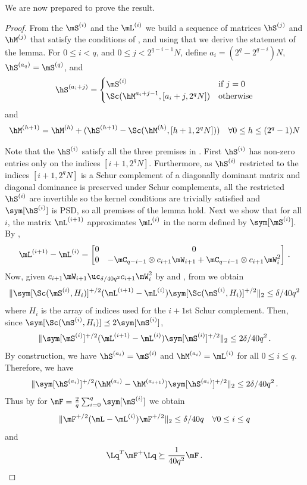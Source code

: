 \documentclass{toc}
\begin{document}
We are now prepared to prove the result.
\AKMsmall*
\begin{proof}
From the %
%
$\mS^{(i)}$ and the $\mL^{(i)}$  %
we build a sequence of    
%
%
%
matrices $\hS^{(j)}$ and $\hM^{(j)}$ %
%
that satisfy the conditions of , and using that we derive
the statement of the lemma. For $0\leq i < q$, and $0\leq j <2^{q-i-1}N$, define
$a_i= (2^q-2^{q-i})N$, $\hS^{(a_q)}=\mS^{(q)}$, 
and
\[ 
\hS^{(a_i+j)} = \begin{cases}
\mS^{(i)} & \text{if } j=0\\
\Sc(\hM^{a_i+j-1},[a_i+j,2^qN]) & \text{otherwise}\end{cases}\]
and
$$\hM^{(h+1)} = \hM^{(h)}+(\hS^{(h+1)}-\Sc(\hM^{(h)},[h+1,2^qN])) \quad \forall 0\leq h \leq (2^q-1)N$$

Note that the %
$\hS^{(i)}$  %
satisfy all the three premises in . First $\hS^{(i)}$ has non-zero entries only on the indices $[i+ 1,2^q N]$. Furthermore, as $\hS^{(i)}$ restricted to the indices $[i+ 1,2^q N]$ is a Schur complement of a diagonally dominant matrix
%
%
and diagonal dominance is preserved under Schur complements, %
%
%
%
all the restricted %
$\hS^{(i)}$   %
are invertible so the kernel %
conditions  %
are trivially satisfied and $\sym[\hS^{(i)}]$ is PSD, so all premises of the lemma hold. 
Next we show that for all %
$i$,  %
the matrix %
%
$\mL^{(i+1)}$ approximates $\mL^{(i)}$ in the norm defined by $\sym[\mS^{(i)}]$.  By
,
$$\mL^{(i+1)}-\mL^{(i)} = \begin{bmatrix} 0 & 0\\ 0 & -\mC_{q-i-1}\otimes c_{i+1}\mW_{i+1}+\mC_{q-i-1}\otimes c_{i+1}\mW_{i}^2\end{bmatrix}\,.$$  %
Now, given $c_{i+1}\mW_{i+1} \uc_{\delta/40q^2}c_{i+1}\mW_{i}^2$ by  and
, from
%
%
we obtain
\[\|\sym[\Sc(\mS^{(i)},H_i)]^{+/2}(\mL^{(i+1)}-\mL^{(i)})\sym[{\Sc(\mS^{(i)},H_i)}]^{+/2}\|_2 \leq \delta/40q^2\]
where $H_i$
%
is the array of %
indices used for the $i+1$st Schur complement. %
Then,  %
since $\sym[\Sc(\mS^{(i)},H_i)] \preceq 2\sym[\mS^{(i)}]$,
\[\|\sym[{\mS^{(i)}}]^{+/2}(\mL^{(i+1)}-\mL^{(i)})\sym[{\mS^{(i)}}]^{+/2}\|_2 \leq 2\delta/40q^2\,.\]
%
By construction, we have $\hS^{(a_i)}=\mS^{(i)}$ and $\hM^{(a_i)}=\mL^{(i)}$ for all $0\leq i\leq q$. Therefore, we have
$$\|\sym[\hS^{(a_i)}]^{+/2}(\hM^{(a_{i})}-\hM^{(a_{i+1})})\sym[\hS^{(a_i)}]^{+/2}\|_2 \leq 2\delta/40q^2 \,.$$ %
Thus by  for $\mF=\frac{2}{q}\sum_{i=0}^q \sym[\mS^{(i)}]$ we obtain
\[\|\mF^{+/2}(\mL-\mL^{(i)})\mF^{+/2}\|_2\leq \delta/40q \quad \forall 0\leq i\leq q\]
and 
\[{\Lq}^T\mF^+\Lq \succeq \frac{1}{40q^2}\mF\,. \qedhere\] 
%
\end{proof}
\end{document}
